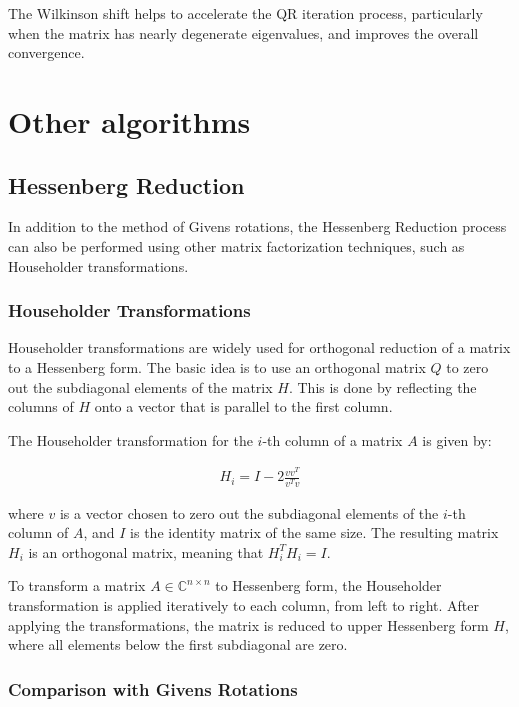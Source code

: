\documentclass[12pt]{article}
\numberwithin{equation}{subsubsection}
\begin{document}
The Wilkinson shift helps to accelerate the QR iteration process, particularly when the matrix has nearly degenerate eigenvalues, and improves the overall convergence.

\section{Other algorithms}

\subsection{Hessenberg Reduction}
In addition to the method of Givens rotations, the Hessenberg Reduction process can also be performed using other matrix factorization techniques, such as Householder transformations.

\subsubsection{Householder Transformations}

Householder transformations are widely used for orthogonal reduction of a matrix to a Hessenberg form. The basic idea is to use an orthogonal matrix $ Q $ to zero out the subdiagonal elements of the matrix $ H $. This is done by reflecting the columns of $ H $ onto a vector that is parallel to the first column. 

The Householder transformation for the $ i $-th column of a matrix $ A $ is given by:

\begin{align}
	H_i = I - 2 \frac{v v^T}{v^T v}
\end{align}

where $ v $ is a vector chosen to zero out the subdiagonal elements of the $ i $-th column of $ A $, and $ I $ is the identity matrix of the same size. The resulting matrix $ H_i $ is an orthogonal matrix, meaning that $ H_i^T H_i = I $. 

To transform a matrix $ A \in \mathbb{C}^{n \times n} $ to Hessenberg form, the Householder transformation is applied iteratively to each column, from left to right. After applying the transformations, the matrix is reduced to upper Hessenberg form $ H $, where all elements below the first subdiagonal are zero.

\subsubsection{Comparison with Givens Rotations}
\end{document}
